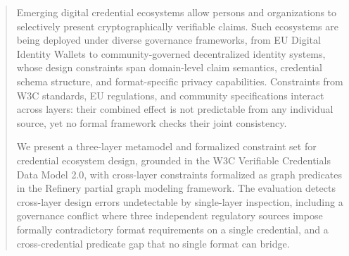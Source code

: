\begin{abstract}
Emerging digital credential ecosystems allow persons and organizations
to selectively present cryptographically verifiable claims. Such
ecosystems are being deployed under diverse governance frameworks, from
EU Digital Identity Wallets to community-governed decentralized identity
systems, whose design constraints span domain-level claim semantics,
credential schema structure, and format-specific privacy capabilities.
Constraints from W3C standards, EU regulations, and community
specifications interact across layers: their combined effect is not
predictable from any individual source, yet no formal framework checks
their joint consistency.

We present a three-layer metamodel and formalized constraint set for
credential ecosystem design, grounded in the W3C Verifiable Credentials
Data Model 2.0, with cross-layer constraints formalized as graph
predicates in the Refinery partial graph modeling framework. The
evaluation detects cross-layer design errors undetectable by single-layer
inspection, including a governance conflict where three independent
regulatory sources impose formally contradictory format requirements on a
single credential, and a cross-credential predicate gap that no single
format can bridge.\end{abstract}
